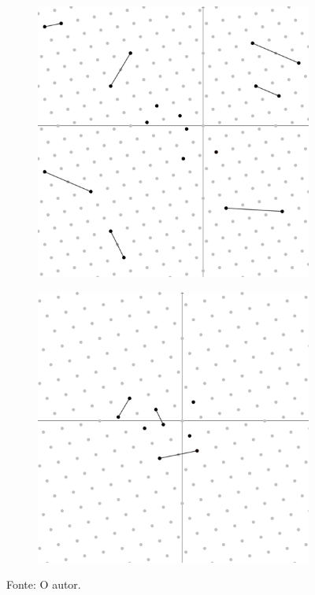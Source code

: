     \begin{figure}[htb!]
        \centering
        \caption{Exemplo do funcionamento do algoritmo \textit{sieving} com duas iterações respectivamente.}
            \begin{subfigure}{.5\textwidth}
                \centering
                \includegraphics[width=.75\linewidth]{Figuras/sieving_1.png}
            \end{subfigure}%
            \begin{subfigure}{.5\textwidth}
                \centering
                \includegraphics[width=.75\linewidth]{Figuras/sieving_2.png}
            \end{subfigure}
        \footnotesize{Fonte: O autor.}
        \label{fig:sieving}
    \end{figure}

